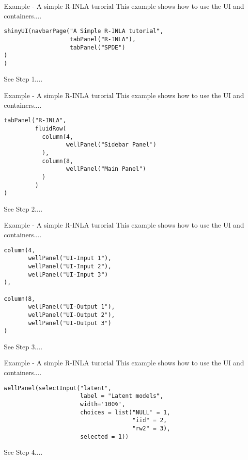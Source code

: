 \documentclass[compress]{beamer}
\begin{document}
\begin{frame}[fragile]{Example - A simple R-INLA turorial}
This example shows how to use the UI and containers....
\begin{tcolorbox}[colback=green!5,colframe=green!40!black, title=ui.R]
\begin{verbatim}
shinyUI(navbarPage("A Simple R-INLA tutorial",
                   tabPanel("R-INLA"),
                   tabPanel("SPDE")
)
)
\end{verbatim}
\end{tcolorbox}
See \alert{Step 1}....
\end{frame}

\begin{frame}[fragile]{Example - A simple R-INLA turorial}
This example shows how to use the UI and containers....
\begin{tcolorbox}[colback=green!5,colframe=green!40!black, title=``R-INLA'' tabPanel]
\begin{verbatim}
tabPanel("R-INLA",
         fluidRow(
           column(4,
                  wellPanel("Sidebar Panel")
           ),
           column(8,
                  wellPanel("Main Panel")
           )
         )
)
\end{verbatim}
\end{tcolorbox}
See \alert{Step 2}....
\end{frame}

\begin{frame}[fragile]{Example - A simple R-INLA turorial}
This example shows how to use the UI and containers....
\begin{tcolorbox}[colback=green!5,colframe=green!40!black, title=``R-INLA'' fluidRow]
\begin{verbatim}
column(4,
       wellPanel("UI-Input 1"),
       wellPanel("UI-Input 2"),
       wellPanel("UI-Input 3")
),

column(8,
       wellPanel("UI-Output 1"),
       wellPanel("UI-Output 2"),
       wellPanel("UI-Output 3")
)
\end{verbatim}
\end{tcolorbox}
See \alert{Step 3}....
\end{frame}


\begin{frame}[fragile]{Example - A simple R-INLA turorial}
This example shows how to use the UI and containers....
\begin{tcolorbox}[colback=green!5,colframe=green!40!black, title=UI-Input 1]
\begin{verbatim}
wellPanel(selectInput("latent", 
                      label = "Latent models", 
                      width='100%',
                      choices = list("NULL" = 1, 
                                     "iid" = 2,
                                     "rw2" = 3), 
                      selected = 1))
\end{verbatim}
\end{tcolorbox}
See \alert{Step 4}....
\end{frame}
\end{document}
